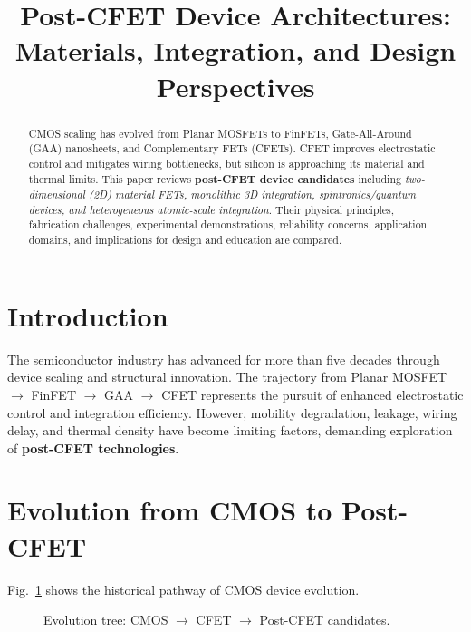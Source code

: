 \documentclass[conference]{IEEEtran}
\title{Post-CFET Device Architectures: Materials, Integration, and Design Perspectives}
\author{
\IEEEauthorblockN{Shinichi Samizo}
\IEEEauthorblockA{Independent Semiconductor Researcher\\
Project Design Hub, Samizo-AITL\\
\textit{Email:} \href{mailto:shin3t72@gmail.com}{shin3t72@gmail.com}\\
\textit{GitHub:} \href{https://github.com/Samizo-AITL}{Samizo-AITL}}
}
\begin{document}
\maketitle

\begin{abstract}
CMOS scaling has evolved from Planar MOSFETs to FinFETs, Gate-All-Around (GAA) nanosheets, and Complementary FETs (CFETs). CFET improves electrostatic control and mitigates wiring bottlenecks, but silicon is approaching its material and thermal limits. This paper reviews \textbf{post-CFET device candidates} including \textit{two-dimensional (2D) material FETs, monolithic 3D integration, spintronics/quantum devices, and heterogeneous atomic-scale integration}. Their physical principles, fabrication challenges, experimental demonstrations, reliability concerns, application domains, and implications for design and education are compared.
\end{abstract}

\section{Introduction}
The semiconductor industry has advanced for more than five decades through device scaling and structural innovation. 
The trajectory from Planar MOSFET $\to$ FinFET $\to$ GAA $\to$ CFET represents the pursuit of enhanced electrostatic control and integration efficiency.  
However, mobility degradation, leakage, wiring delay, and thermal density have become limiting factors, demanding exploration of \textbf{post-CFET technologies}.

\section{Evolution from CMOS to Post-CFET}
Fig.~\ref{fig:evolution} shows the historical pathway of CMOS device evolution.

\begin{figure}[t]
  \centering
  
  \caption{Evolution tree: CMOS $\to$ CFET $\to$ Post-CFET candidates.}
  \label{fig:evolution}
\end{figure}
\end{document}
